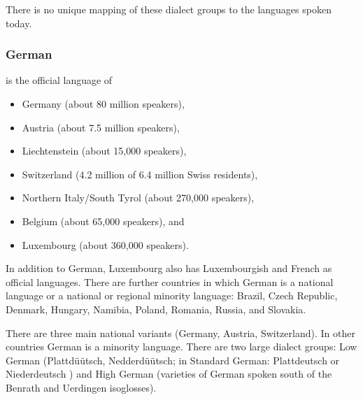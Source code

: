 There is no unique mapping of these dialect groups to the languages spoken today.





\subsubsection{German}

 is the official language of
\begin{itemize}
\item Germany (about 80 million speakers), 
\item Austria (about 7.5 million speakers), 
\item Liechtenstein (about 15,000 speakers), 
\item Switzerland (4.2 million of 6.4 million Swiss residents),
\item Northern Italy/South Tyrol (about 270,000 speakers), 
\item Belgium (about 65,000 speakers), and
\item Luxembourg (about 360,000 speakers).
\end{itemize}
In addition to German, Luxembourg also has Luxembourgish and French as official
languages. 
There are further countries in which German is a national language or a national or regional
minority language: Brazil, Czech Republic, Denmark, Hungary, Namibia, Poland, Romania, Russia, and Slovakia.


There are three main national variants (Germany, Austria, Switzerland). In other countries German is
a minority language. There are two large dialect groups: Low German (Plattdüütsch,
Nedderdüütsch; in Standard German: Platt\-deutsch or Nie\-der\-deutsch%
) and High German (varieties of German spoken south of the Benrath and Uerdingen
isoglosses).

